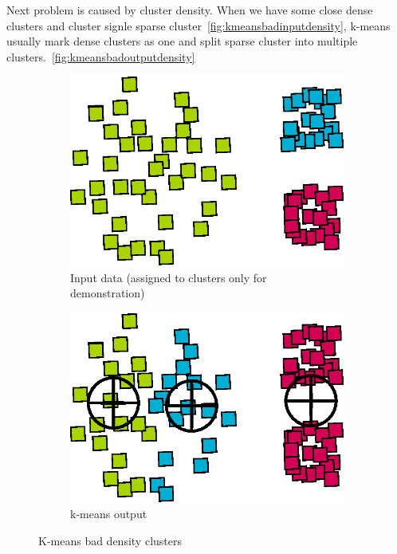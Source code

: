 Next problem is caused by cluster density. When we have some close dense clusters and cluster signle sparse cluster~\autoref{fig:kmeansbadinputdensity}, k-means usually mark dense clusters as one and split sparse cluster into multiple clusters.~\autoref{fig:kmeansbadoutputdensity}
\begin{figure}[h]
\begin{subfigure}{.49\textwidth}
  \centering
  \includegraphics[width=.5\linewidth]{img/kmeans_badInputSampleDensity.eps}
  \caption{Input data (assigned to clusters only for demonstration)}
  \label{fig:kmeansbadinputdensity}
\end{subfigure}
\begin{subfigure}{.49\textwidth}
  \centering
  \includegraphics[width=.5\linewidth]{img/kmeans_badOutputSampleDensity.eps}
  \caption{k-means output}
  \label{fig:kmeansbadoutputdensity}
\end{subfigure}
\caption{K-means bad density clusters}
\end{figure}

